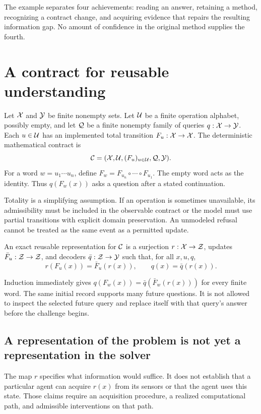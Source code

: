 The example separates four achievements: reading an answer, retaining a method, recognizing a contract change, and acquiring evidence that repairs the resulting information gap. No amount of confidence in the original method supplies the fourth.

\section{A contract for reusable understanding}\label{MU:sec:contract}
Let $\mathcal X$ and $\mathcal Y$ be finite nonempty sets. Let $\mathcal U$ be a finite operation alphabet, possibly empty, and let $\mathcal Q$ be a finite nonempty family of queries $q:\mathcal X\to\mathcal Y$. Each $u\in\mathcal U$ has an implemented total transition $F_u:\mathcal X\to\mathcal X$. The deterministic mathematical contract is
\[
\mathcal C=(\mathcal X,\mathcal U,(F_u)_{u\in\mathcal U},\mathcal Q,\mathcal Y).
\]
For a word $w=u_1\cdots u_n$, define $F_w=F_{u_n}\circ\cdots\circ F_{u_1}$. The empty word acts as the identity. Thus $q(F_w(x))$ asks a question after a stated continuation.

Totality is a simplifying assumption. If an operation is sometimes unavailable, its admissibility must be included in the observable contract or the model must use partial transitions with explicit domain preservation. An unmodeled refusal cannot be treated as the same event as a permitted update.

\begin{MUdefinition}\label{MU:def:representation}
An exact reusable representation for $\mathcal C$ is a surjection $r:\mathcal X\to\mathcal Z$, updates $\bar F_u:\mathcal Z\to\mathcal Z$, and decoders $\bar q:\mathcal Z\to\mathcal Y$ such that, for all $x,u,q$,
\begin{equation}\label{MU:eq:representation-contract}
r(F_u(x))=\bar F_u(r(x)),\qquad q(x)=\bar q(r(x)).
\end{equation}
\end{MUdefinition}
Induction immediately gives $q(F_w(x))=\bar q(\bar F_w(r(x)))$ for every finite word. The same initial record supports many future questions. It is not allowed to inspect the selected future query and replace itself with that query's answer before the challenge begins.

\subsection{A representation of the problem is not yet a representation in the solver}
The map $r$ specifies what information would suffice. It does not establish that a particular agent can acquire $r(x)$ from its sensors or that the agent uses this state. Those claims require an acquisition procedure, a realized computational path, and admissible interventions on that path.

